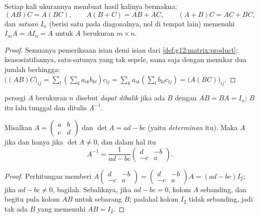 \begin{proposition}\label{prop:g12:matrix:rules}
Setiap kali ukurannya membuat hasil kalinya bermakna:
\[
(AB)C = A(BC), \qquad A(B + C) = AB + AC, \qquad (A+B)C = AC + BC,
\]
dan \emph{ satuan} $I_n$ (berisi satu pada diagonalnya, nol di tempat lain)
memenuhi $I_m A = A I_n = A$ untuk $A$ berukuran $m \times n$.
\end{proposition}

\begin{proof}
Semuanya pemeriksaan isian demi isian dari
\cref{def:g12:matrix:product}; keasosiatifannya, satu-satunya yang tak sepele,
sama saja dengan menukar dua jumlah berhingga:
$\bigl((AB)C\bigr)_{ij} = \sum_l \left(\sum_k a_{ik}b_{kl}\right) c_{lj}
= \sum_k a_{ik} \left(\sum_l b_{kl} c_{lj}\right)
= \bigl(A(BC)\bigr)_{ij}$.
\end{proof}

\begin{definition}[Balikan]\label{def:g12:matrix:inverse}
 persegi $A$ berukuran $n$ disebut \emph{dapat dibalik}
jika ada  $B$ dengan $AB = BA = I_n$;  $B$ itu lalu tunggal dan ditulis
$A^{-1}$.
\end{definition}

\begin{proposition}\label{prop:g12:matrix:inverse2x2}
Misalkan $A = \begin{pmatrix} a & b\\ c & d\end{pmatrix}$ dan
$\det A = ad - bc$ (yaitu \emph{determinan}  itu). Maka $A$
 jika dan hanya jika $\det A \neq 0$, dan dalam hal itu
\[
A^{-1} = \frac{1}{ad - bc}\begin{pmatrix} d & -b\\ -c & a\end{pmatrix}.
\]
\end{proposition}

\begin{proof}
Perhitungan memberi
$A \begin{pmatrix} d & -b\\ -c & a\end{pmatrix}
= \begin{pmatrix} d & -b\\ -c & a\end{pmatrix} A = (ad - bc) I_2$; jika
$ad - bc \neq 0$, bagilah. Sebaliknya, jika $ad - bc = 0$, kolom $A$
sebanding, dan begitu pula kolom $AB$ untuk sebarang $B$; padahal
kolom $I_2$ tidak sebanding, jadi tak ada $B$ yang memenuhi $AB = I_2$.
\end{proof}

